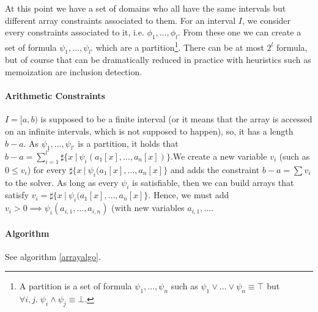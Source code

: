 \documentclass[]{article}
\begin{document}
{At this point we have a set of domains who all have the same intervals
but different array constraints associated to them. For an interval
$I$, we consider every constraints associated to it, i.e.
$\phi_1, \ldots, \phi_l$. From these one we can create a set of formula
$\psi_1, \ldots, \psi_{l'}$ which are a
partition\footnote{A partition is a set of formula $\psi_1, \ldots, \psi_n$ such as $\psi_1 \lor \ldots \lor \psi_n \equiv \top$ but $\forall i, j. \; \psi_i \land \psi_j \equiv \bot$.}.
There can be at most $2^l$ formula, but of course that can be
dramatically reduced in practice with heuristics such as memoization are
inclusion detection.

\paragraph{Arithmetic Constraints}\label{arithmetic-constraints}

$I = [a, b)$ is supposed to be a finite interval (or it means that the
array is accessed on an infinite intervals, which is not supposed to
happen), so, it has a length $b - a$. As $\psi_1, \ldots, \psi_{l'}$ is a
partition, it holds that
$b - a = \sum\limits_{i = 1}^{l'} \sharp\{x \ |\ \psi_i(a_1[x], \ldots, a_n[x])\}$.We
create a new variable $v_i$ (such as $0 \le v_i$) for every
$\sharp\{x\ |\ \psi_i(a_1[x], \ldots, a_n[x]\}$ and adds the constraint
$b - a = \sum v_i$ to the solver. As long as every $\psi_i$ is
satisfiable, then we can build arrays that satisfy
$v_i = \sharp\{x\ |\ \psi_i(a_1[x], \ldots, a_n[x]\}$. Hence, we must add
$v_i > 0 \implies \psi_i(a_{i, 1}, \ldots, a_{i, n})$ (with new variables
$a_{i, 1}, \ldots$.

\paragraph{Algorithm}\label{algorithm-1}

See algorithm \ref{arrayalgo}.

}
\end{document}
